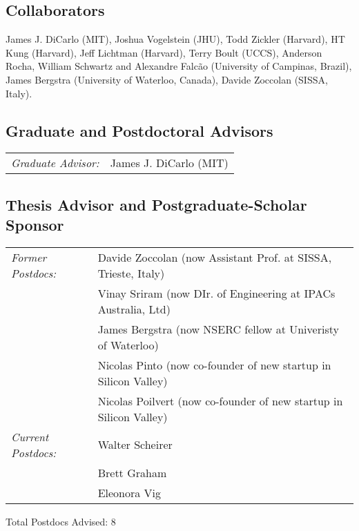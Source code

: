 \documentclass{nsfproposal}
\begin{document}
\subsection{Collaborators}

James J. DiCarlo (MIT), Joshua Vogelstein (JHU), Todd Zickler (Harvard), HT Kung (Harvard), Jeff Lichtman (Harvard), Terry Boult (UCCS), Anderson Rocha, William Schwartz and Alexandre Falcão (University of Campinas, Brazil), James Bergstra (University of Waterloo, Canada), Davide Zoccolan (SISSA, Italy).

\subsection{Graduate and Postdoctoral Advisors}

\begin{tabular}{l l}
\emph{Graduate Advisor:} & James J. DiCarlo (MIT)
\end{tabular}


\subsection{Thesis Advisor and Postgraduate-Scholar Sponsor}

\begin{tabular}{l l}
\emph{Former Postdocs:} & Davide Zoccolan (now Assistant Prof. at SISSA, Trieste, Italy) \\
				 		& Vinay Sriram (now DIr. of Engineering at IPACs Australia, Ltd)\\
				 		& James Bergstra (now NSERC fellow at Univeristy of Waterloo)\\
				 		& Nicolas Pinto (now co-founder of new startup in Silicon Valley)\\
				 		& Nicolas Poilvert (now co-founder of new startup in Silicon Valley)\\
\emph{Current Postdocs:} & Walter Scheirer \\
				   		 & Brett Graham \\
				   		 & Eleonora Vig

\end{tabular}

\vspace{1em}
\noindent Total Postdocs Advised: 8
\end{document}
